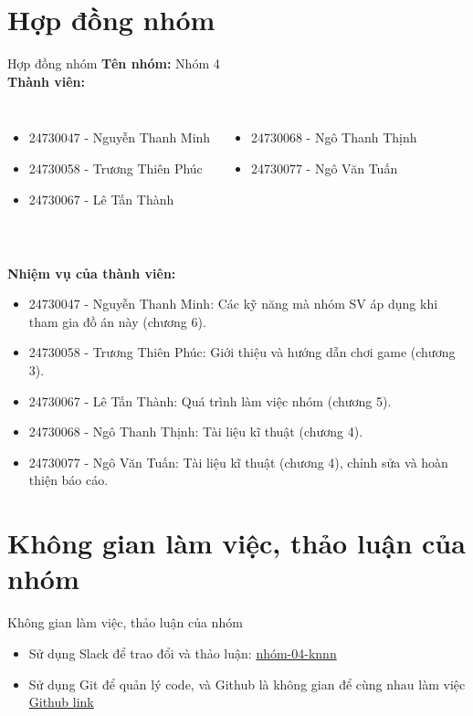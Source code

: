 \documentclass{beamer}
\begin{document}
\section{Hợp đồng nhóm}
\begin{frame}{Hợp đồng nhóm}
\fontsize{10pt}{8pt}\selectfont
    \textbf{Tên nhóm:} Nhóm 4\\
    \textbf{Thành viên:}
    \begin{columns}[T] %
        \begin{itemize}
            \item 24730047 - Nguyễn Thanh Minh
            \item 24730058 - Trương Thiên Phúc
            \item 24730067 - Lê Tấn Thành
        \end{itemize}
        
        \begin{itemize}
            \item 24730068 - Ngô Thanh Thịnh
            \item 24730077 - Ngô Văn Tuấn
        \end{itemize}
    \end{columns}
    \textbf{\\Nhiệm vụ của thành viên:}
    \begin{itemize}
        \item 24730047 - Nguyễn Thanh Minh: Các kỹ năng mà nhóm SV áp dụng khi tham gia đồ án này (chương 6).
        \item 24730058 - Trương Thiên Phúc: Giới thiệu và hướng dẫn chơi game (chương 3).
        \item 24730067 - Lê Tấn Thành: Quá trình làm việc nhóm (chương 5).
        \item 24730068 - Ngô Thanh Thịnh: Tài liệu kĩ thuật (chương 4).
        \item 24730077 - Ngô Văn Tuấn: Tài liệu kĩ thuật (chương 4), chỉnh sửa và hoàn thiện báo cáo.
    \end{itemize}
\end{frame}

\section{Không gian làm việc, thảo luận của nhóm}
\begin{frame}{Không gian làm việc, thảo luận của nhóm}
    \begin{itemize}
        \item Sử dụng Slack để trao đổi và thảo luận: \href{https://ss004e11cn1.slack.com/archives/C07T94K918U}{ nhóm-04-knnn}
        \item Sử dụng Git để quản lý code, và Github là không gian để cùng nhau làm việc \href{https://github.com/ThinhNgo96/snake_game}{Github link}
    \end{itemize}
\end{frame}
\end{document}
